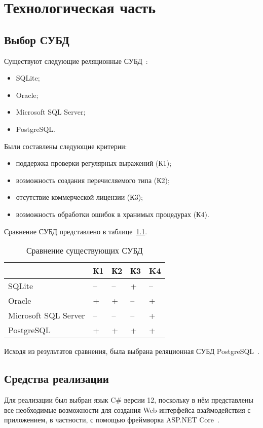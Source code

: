 \chapter{Технологическая часть}
\section{Выбор СУБД}

Существуют следующие реляционные СУБД~\cite{dbanalyse}:
\begin{itemize}
	\item SQLite;
	\item Oracle;
	\item Microsoft SQL Server;
	\item PostgreSQL. 
\end{itemize}
Были составлены следующие критерии:
\begin{itemize}
	\item поддержка проверки регулярных выражений (К1);
	\item возможность создания перечисляемого типа (К2);
	\item отсутствие коммерческой лицензии (К3);
	\item возможность обработки ошибок в хранимых процедурах (К4).
\end{itemize}
Сравнение СУБД представлено в таблице~\ref{tbl:dbms_compr}. 
\begin{table}[h!]
	\centering
	\caption{\label{tbl:dbms_compr}Сравнение существующих СУБД}
	\begin{tabular}{|l|l|l|l|l|}
		\hline
		& К1 & К2 & К3 & K4\\\hline
		SQLite & -- & -- & + & --\\\hline
	 	Oracle & + & + & -- & + \\\hline
		Microsoft SQL Server & -- & -- & -- & +\\\hline
		PostgreSQL & + & + & + & + \\\hline
	\end{tabular}
\end{table}

Исходя из результатов сравнения, была выбрана реляционная СУБД PostgreSQL~\cite{postgresql}.

\section{Средства реализации}

Для реализации был выбран язык C\# версии 12, поскольку в нём представлены все необходимые возможности для создания Web-интерфейса взаймодействия с приложением, в частности, с помощью фреймворка ASP.NET Core~\cite{aspnet}.

